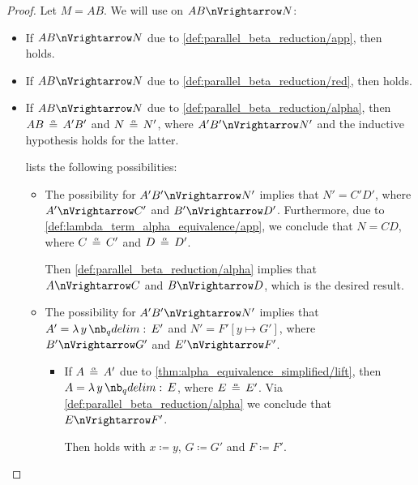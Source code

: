 \begin{proof}
   Let \( M = AB \). We will use  on \( AB \pred N \):
  \begin{itemize}
    \item If \( AB \pred N \) due to \ref{def:parallel_beta_reduction/app}, then  holds.

    \item If \( AB \pred N \) due to \ref{def:parallel_beta_reduction/red}, then  holds.

    \item If \( AB \pred N \) due to \ref{def:parallel_beta_reduction/alpha}, then \( AB \aequiv A' B' \) and \( N \aequiv N' \), where \( A' B' \pred N' \) and the inductive hypothesis holds for the latter.

     lists the following possibilities:
    \begin{itemize}
      \item The possibility  for \( A' B' \pred N' \) implies that \( N' = C' D' \), where \( A' \pred C' \) and \( B' \pred D' \). Furthermore, due to \ref{def:lambda_term_alpha_equivalence/app}, we conclude that \( N = CD \), where \( C \aequiv C' \) and \( D \aequiv D' \).

      Then \ref{def:parallel_beta_reduction/alpha} implies that \( A \pred C \) and \( B \pred D \), which is the desired result.

      \item The possibility  for \( A' B' \pred N' \) implies that \( A' = \qabs y E' \) and \( N' = F'[y \mapsto G'] \), where \( B' \pred G' \) and \( E' \pred F' \).

      \begin{itemize}
        \item If \( A \aequiv A' \) due to \ref{thm:alpha_equivalence_simplified/lift}, then \( A = \qabs y E \), where \( E \aequiv E' \). Via \ref{def:parallel_beta_reduction/alpha} we conclude that \( E \pred F' \).

        Then  holds with \( x \coloneqq y \), \( G \coloneqq G' \) and \( F \coloneqq F' \).


\end{itemize}
\end{itemize}
\end{itemize}
\end{proof}
